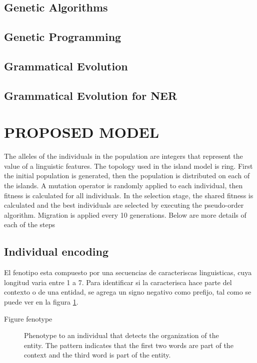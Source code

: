 \subsection{Genetic Algorithms}
\subsection{Genetic Programming}
\subsection{Grammatical Evolution}
\subsection{Grammatical Evolution for NER}
\section{PROPOSED MODEL}

The alleles of the individuals in the population are integers that represent the value of a linguistic features. The topology used in the island model is ring. First the initial population is generated, then the population is distributed on each of the islands. A mutation operator is randomly applied to each individual, then fitness is calculated for all individuals. In the selection stage, the shared fitness is calculated and the best individuals are selected by executing the pseudo-order algorithm.
Migration is applied every 10 generations. Below are more details of each of the steps

\subsection{Individual encoding}

El fenotipo esta compuesto por una secuencias de caracteriscas linguisticas, cuya longitud varia entre 1 a 7. Para identificar si la caracterisca hace parte del contexto o de una entidad, se agrega un signo negativo como prefijo, tal como se puede ver en la figura \ref{fig:fenotype}.

Figure fenotype
\begin{figure}
  \centering%
  \caption{Phenotype to an individual that detects the organization of the entity. The pattern indicates that the first two words are part of the context and the third word is part of the entity.}
  \label{fig:fenotype}
\end{figure}


